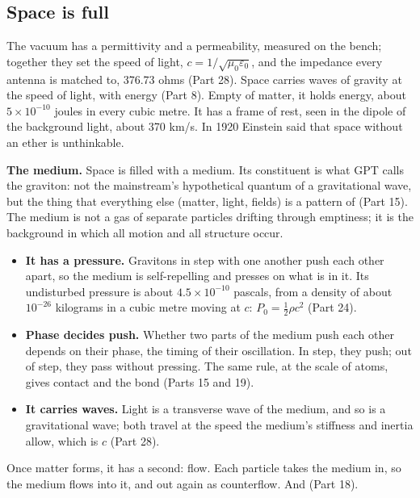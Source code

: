 \documentclass[11pt,a4paper]{article}
\begin{document}
\subsection{Space is full}

 The vacuum has a permittivity and a permeability, measured on the bench; together they set the speed of light, $c = 1/\sqrt{\mu_0\varepsilon_0}$, and the impedance every antenna is matched to, 376.73 ohms (Part 28). Space carries waves of gravity at the speed of light, with energy (Part 8). Empty of matter, it holds energy, about $5\times10^{-10}$ joules in every cubic metre. It has a frame of rest, seen in the dipole of the background light, about 370 km/s. In 1920 Einstein said that space without an ether is unthinkable.

\begin{hypbar}
\textbf{The medium.} Space is filled with a medium. Its constituent is what GPT calls the graviton: not the mainstream's hypothetical quantum of a gravitational wave, but the thing that everything else (matter, light, fields) is a pattern of (Part 15).\footnotemark{} The medium is not a gas of separate particles drifting through emptiness; it is the background in which all motion and all structure occur.
\begin{itemize}
\item \textbf{It has a pressure.} Gravitons in step with one another push each other apart, so the medium is self-repelling and presses on what is in it. Its undisturbed pressure is about $4.5\times10^{-10}$ pascals, from a density of about $10^{-26}$ kilograms in a cubic metre moving at $c$: $P_0 = \tfrac12\rho c^2$ (Part 24).
\item \textbf{Phase decides push.} Whether two parts of the medium push each other depends on their phase, the timing of their oscillation. In step, they push; out of step, they pass without pressing. The same rule, at the scale of atoms, gives contact and the bond (Parts 15 and 19).
\item \textbf{It carries waves.} Light is a transverse wave of the medium, and so is a gravitational wave; both travel at the speed the medium's stiffness and inertia allow, which is $c$ (Part 28).
\end{itemize}
\end{hypbar}

 Once matter forms, it has a second: flow. Each particle takes the medium in, so the medium flows into it, and out again as counterflow. And  (Part 18).
\end{document}
